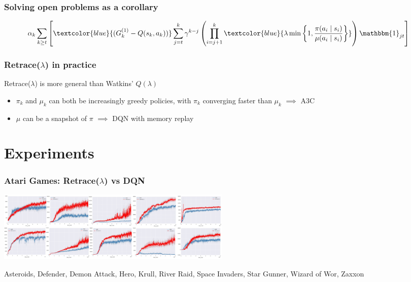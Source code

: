 \documentclass{beamer}
\begin{document}
\begin{frame}
\frametitle{Solving open problems as a corollary}
\begin{align*}
	&\alpha_k
	\sum_{k\geq t}\left[
	\textcolor{blue}{(G_k^{(1)} - Q(s_k,a_k))}
	\sum_{j=t}^k\gamma^{k-j}
	\left(\prod_{i=j+1}^k 
	\textcolor{blue}{\lambda\min\left\{1,\frac{\pi(a_i\mid s_i)}{\mu(a_i\mid s_i)}\right\}}
	\right)
	\mathbbm{1}_{jt}
	\right]
\end{align*}
\end{frame}

\begin{frame}
\frametitle{Retrace($\lambda$) in practice}
Retrace($\lambda$) is more general than Watkins' $Q(\lambda)$
\pause
\begin{itemize}
\item<2-> $\pi_k$ and $\mu_k$ can both be increasingly greedy policies, with $\pi_k$ converging faster than $\mu_k$ $\implies $ A3C \cite{mnih2016asynchronous}
\item<3-> $\mu$ can be a snapshot of $\pi$ $\implies$ DQN with memory replay \cite{mnih2015human}
\end{itemize}
\end{frame}
\section{Experiments}
\frame{\tableofcontents[currentsection]}

\begin{frame}
\frametitle{Atari Games: Retrace($\lambda$) vs DQN} 
\centering
\bigskip\bigskip
\includegraphics[height=3.4cm]{images/atari1}

Asteroids, Defender, Demon Attack, Hero, Krull,
River Raid, Space Invaders, Star Gunner, Wizard of Wor, Zaxxon
\end{frame}
\end{document}
